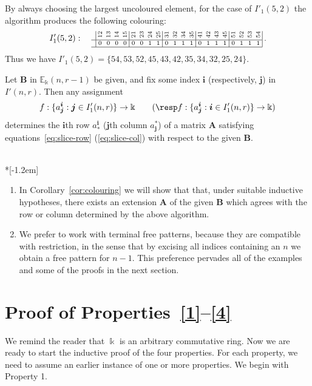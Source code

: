 \documentclass[ALCO,ThmDefs,Unicode,epreuves]{cedram}
\newcommand{\E}{\mathbb{E}}
\newcommand{\bi}{{\boldsymbol{i}}} %
\newcommand{\bj}{{\boldsymbol{j}}}
\newcommand{\bA}{\mathbf{A}}
\newcommand{\bB}{\mathbf{B}}
\newcommand{\rt}[1]{\rotatebox{90}{#1}}
\begin{document}
\begin{exam}
By always choosing the largest uncoloured element, for the case of
$I'_1(5,2)$ the algorithm produces the following colouring:
\[
 I'_1(5,2): \quad
\text{\setlength{\arraycolsep}{2.7pt}\scriptsize
$\displaystyle \begin{array}{c|cccc|cccc|cccc|cccc|cccc|}
 &\rt{12}&\rt{13}&\rt{14}&\rt{15}&\rt{21} &\rt{23}&\rt{24}&\rt{25}
 &\rt{31}&\rt{32} &\rt{34}&\rt{35}&\rt{41}&\rt{42}&\rt{43} &\rt{45} 
 &\rt{51}&\rt{52}&\rt{53} &\rt{54} \\ \hline
 &0&0&0&0	&0&0&1&1	 &0&1&1&1	&0&1&1&1 &0&1&1&1
 \\ 
 \hline
\end{array}\; .$}
\]
Thus we have $I'_1(5,2) = \{54, 53, 52, 45, 43, 42, 35, 34, 32, 25, 24\}$.
\end{exam}

Let $\bB$ in $\E_\Bbbk(n,r-1)$ be given, and fix some index $\bi$
(respectively, $\bj$) in $I'(n,r)$. Then any assignment
 \[
 f: \{ a^\bi_\bj : \bj \in I'_1(n,r)\} \to \Bbbk \qquad (\resp f: \{
 a^\bi_\bj : \bi \in I'_1(n,r)\} \to \Bbbk )
 \]
determines the $\bi$th row $a^\bi_*$ (\resp $\bj$th column $a^*_\bj$)
of a matrix $\bA$ satisfying equations~\eqref{eq:slice-row} (\resp \eqref{eq:slice-col}) with respect to the given $\bB$.


\goodbreak
\begin{rema}\label{rmk:promise}\ \\*[-1.2em]
\begin{enumerate}[label=(\roman*)]
\item\label{rema5.6_i} In Corollary~\ref{cor:colouring} we will show that that, under
suitable inductive hypotheses, there exists an extension $\bA$ of the
given $\bB$ which agrees with the row or column determined by the
above algorithm.

\item\label{rema5.6_ii} We prefer to work with terminal free patterns, because they are
compatible with restriction, in the sense that by excising all indices
containing an $n$ we obtain a free pattern for $n-1$. This preference
pervades all of the examples and some of the proofs in the next
section.
\end{enumerate}
\end{rema}



\section{Proof of Properties~\texorpdfstring{\ref{1}--\ref{4}}{1--4}}\label{sec:proof}
We remind the reader that $\Bbbk$ is an arbitrary commutative
ring. Now we are ready to start the inductive proof of the four
properties. For each property, we need to assume an earlier instance
of one or more properties. We begin with Property 1.
\end{document}
